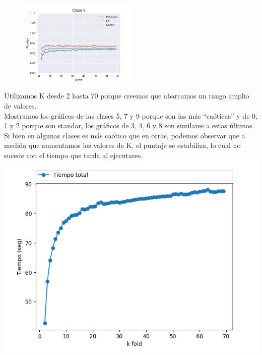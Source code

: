 \begin{figure}[H]
{    \includegraphics[width=0.5\textwidth]{informe/imagenes/kfold/knn/clase9.pdf}}

\end{figure}



Utilizamos K desde 2 hasta 70 porque creemos que abarcamos un rango amplio de valores.\\

Mostramos los gráficos de las clases 5, 7 y 9 porque son las más ``caóticas'' y de 0, 1 y 2 porque son standar, los gráficos de 3, 4, 6 y 8 son similares a estos últimos.\\

Si bien en algunas clases es más caótico que en otras, podemos observar que a medida que aumentamos los valores de K, el puntaje se estabiliza, lo cual no sucede con el tiempo que tarda al ejecutarse.\\

{\centering
    \includegraphics[scale=0.8]{informe/imagenes/kfold/knn/tiempokfold.png} \\
}
$ $\newline

